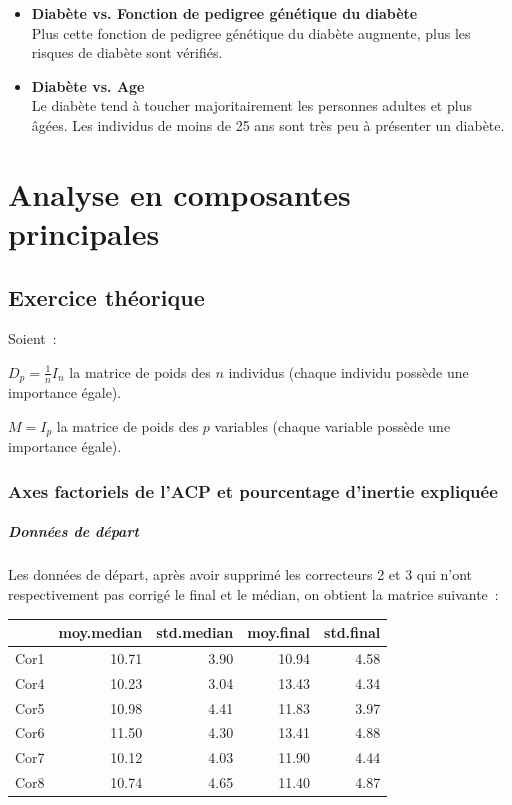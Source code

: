 \documentclass[a4paper,11pt]{report}
\begin{document}
\begin{itemize}
	\item \textbf{Diabète vs. Fonction de pedigree génétique du diabète}
	\\ Plus cette fonction de pedigree génétique du diabète augmente, plus les risques de diabète sont vérifiés.
		
	\item \textbf{Diabète vs. Age}
	\\ Le diabète tend à toucher majoritairement les personnes adultes et plus âgées. Les individus de moins de 25 ans sont très peu à présenter un diabète.
\end{itemize}




\chapter{Analyse en composantes principales}


\section{Exercice théorique}

Soient~:


$D_p = \frac{1}{n}I_n$ la matrice de poids des $n$ individus (chaque individu possède une importance égale).


$M = I_p$ la matrice de poids des $p$ variables (chaque variable possède une importance égale).


\subsection{Axes factoriels de l'ACP et pourcentage d'inertie expliquée}

\paragraph{Données de départ}
Les données de départ, après avoir supprimé les correcteurs 2 et 3 qui n'ont respectivement pas corrigé le final et le médian, on obtient la matrice suivante~:


\begin{table}[H]
	\centering
	\begin{tabular}{r|rrrr}
		& moy.median & std.median & moy.final & std.final \\ 
		\hline
		Cor1 & 10.71 & 3.90 & 10.94 & 4.58 \\ 
		Cor4 & 10.23 & 3.04 & 13.43 & 4.34 \\ 
		Cor5 & 10.98 & 4.41 & 11.83 & 3.97 \\ 
		Cor6 & 11.50 & 4.30 & 13.41 & 4.88 \\ 
		Cor7 & 10.12 & 4.03 & 11.90 & 4.44 \\ 
		Cor8 & 10.74 & 4.65 & 11.40 & 4.87 \\ 
	\end{tabular}
\end{table}
\end{document}
